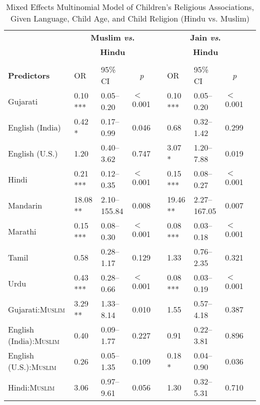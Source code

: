 \begin{table}[ht]
\tiny
\caption{Mixed Effects Multinomial Model of Children's Religious Associations, Given Language, Child Age, and Child Religion (Hindu vs. Muslim)}
    \centering
    \vspace{5pt}
    \setlength{\tabcolsep}{1.75pt} 
\begin{threeparttable}
\begin{tabular}{lllllllll}
\toprule
\midrule
& \multicolumn{3}{c}{\textbf{Muslim \textit{vs}.}} & & \multicolumn{3}{c}{\textbf{Jain \textit{vs}.}}\\
& \multicolumn{3}{c}{\textbf{Hindu}\tnote{a}} & & \multicolumn{3}{c}{\textbf{Hindu}\tnote{a}}\\
\cline{2-4} \cline{6-8} \\[-.75em]
\textbf{Predictors} & OR & 95\% CI & \multicolumn{1}{c}{\textit{p}} & & OR & 95\% CI & \multicolumn{1}{c}{\textit{p}} \\ 
\midrule
Gujarati & 0.10 *** & 0.05--0.20 & $<$0.001 &  & 0.10 *** & 0.05--0.20 & $<$0.001 \\ 
English (India) & 0.42 * & 0.17--0.99 & 0.046 &  & 0.68 & 0.32--1.42 & 0.299 \\ 
English (U.S.) & 1.20 & 0.40--3.62 & 0.747 &  & 3.07 * & 1.20--7.88 & 0.019 \\ 
Hindi & 0.21 *** & 0.12--0.35 & $<$0.001 &  & 0.15 *** & 0.08--0.27 & $<$0.001 \\ 
Mandarin & 18.08 ** & 2.10--155.84 & 0.008 &  & 19.46 ** & 2.27--167.05 & 0.007 \\ 
Marathi & 0.15 *** & 0.08--0.30 & $<$0.001 &  & 0.08 *** & 0.03--0.18 & $<$0.001 \\ 
Tamil & 0.58 & 0.28--1.17 & 0.129 &  & 1.33 & 0.76--2.35 & 0.321 \\ 
Urdu & 0.43 *** & 0.28--0.66 & $<$0.001 &  & 0.08 *** & 0.03--0.19 & $<$0.001 \\ 
Gujarati:\textsc{Muslim} & 3.29 ** & 1.33--8.14 & 0.010 &  & 1.55 & 0.57--4.18 & 0.387 \\ 
English (India):\textsc{Muslim} & 0.40 & 0.09--1.77 & 0.227 &  & 0.91 & 0.22--3.81 & 0.896 \\ 
English (U.S.):\textsc{Muslim} & 0.26 & 0.05--1.35 & 0.109 &  & 0.18 * & 0.04--0.90 & 0.036 \\ 
Hindi:\textsc{Muslim} & 3.06 & 0.97--9.61 & 0.056 &  & 1.30 & 0.32--5.31 & 0.710 \\ 

\end{tabular}
\end{threeparttable}
\end{table}
